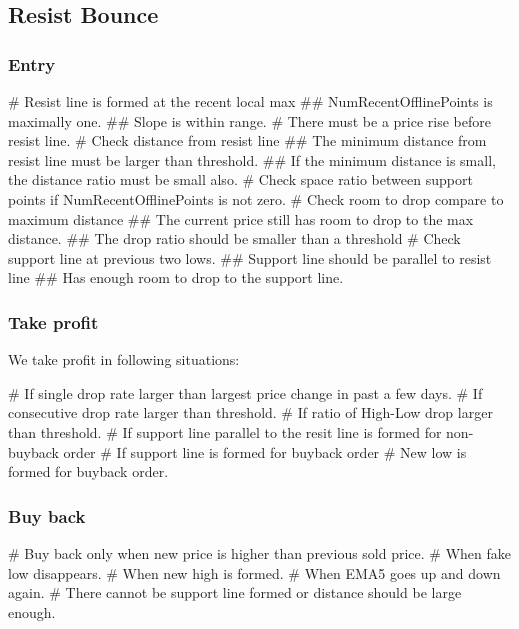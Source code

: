 \subsection{Resist Bounce}

\subsubsection{Entry}
\begin{listb}
# Resist line is formed at the recent local max
  ## NumRecentOfflinePoints is maximally one. 
  ## Slope is within range.
# There must be a price rise before resist line. 
# Check distance from resist line
  ## The minimum distance from resist line must be larger than threshold.
  ## If the minimum distance is small, the distance ratio must be small also. 
# Check space ratio between support points if NumRecentOfflinePoints is not zero.
# Check room to drop compare to maximum distance
  ## The current price still has room to drop to the max distance. 
  ## The drop ratio should be smaller than a threshold
# Check support line at previous two lows.
  ## Support line should be parallel to resist line
  ## Has enough room to drop to the support line. 
\end{listb}

\subsubsection{Take profit}
We take profit in following situations:

\begin{listb}
# If single drop rate larger than largest price change in past a few days. 
# If consecutive drop rate larger than threshold.
# If ratio of High-Low drop larger than threshold.
# If support line parallel to the resit line is formed for non-buyback order
# If support line is formed for buyback order
# New low is formed for buyback order.
\end{listb}


\subsubsection{Buy back}
\begin{listb}
# Buy back only when new price is higher than previous sold price.
# When fake low disappears. 
# When new high is formed. 
# When EMA5 goes up and down again. 
# There cannot be support line formed or distance should be large enough.
\end{listb}

